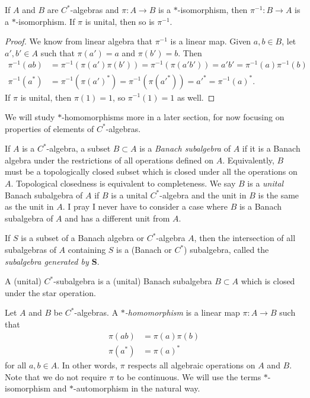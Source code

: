 \begin{proposition}
If $A$ and $B$ are $C^*$-algebras and $\pi:A \rightarrow B$ is a $*$-isomorphism, then $\pi^{-1}:B \rightarrow A$ is a $*$-isomorphism. If $\pi$ is unital, then so is $\pi^{-1}$.
\end{proposition}

\begin{proof}
We know from linear algebra that $\pi^{-1}$ is a linear map. Given $a, b \in B$, let $a', b' \in A$ such that $\pi(a') = a$ and $\pi(b') = b$. Then
\begin{equation}
\begin{aligned}
\pi^{-1}(ab) &= \pi^{-1}(\pi(a')\pi(b')) = \pi^{-1}(\pi(a'b')) = a'b' = \pi^{-1}(a)\pi^{-1}(b)\\
\pi^{-1}(a^*) &= \pi^{-1}(\pi(a')^*) = \pi^{-1}(\pi(a'^*)) = a'^* = \pi^{-1}(a)^*.
\end{aligned}
\end{equation}
If $\pi$ is unital, then $\pi(1) = 1$, so $\pi^{-1}(1) = 1$ as well.
\end{proof}


We will study $*$-homomorphisms more in a later section, for now focusing on properties of elements of $C^*$-algebras.

\begin{definition}
If $A$ is a $C^*$-algebra, a subset $B \subset A$ is a \emph{Banach subalgebra} of $A$ if it is a Banach algebra under the restrictions of all operations defined on $A$. Equivalently, $B$ must be a topologically closed subset which is closed under all the operations on $A$. Topological closedness is equivalent to completeness. We say $B$ is a \emph{unital} Banach subalgebra of $A$ if $B$ is a unital $C^*$-algebra and the unit in $B$ is the same as the unit in $A$.  I pray I never have to consider a case where $B$ is a Banach subalgebra of $A$ and has a different unit from $A$.

If $S$ is a subset of a Banach algebra or $C^*$-algebra $A$, then the intersection of all subalgebras of $A$ containing $S$ is a (Banach or $C^*$) subalgebra, called the \emph{subalgebra generated by $\boldsymbol{S}$}.

A (unital) $C^*$-subalgebra is a (unital) Banach subalgebra $B\subset A$ which is closed under the star operation. 
\end{definition}

\begin{definition}
Let $A$ and $B$ be $C^*$-algebras. A \emph{$\boldsymbol{*}$-homomorphism} is a linear map $\pi:A \rightarrow B$ such that
\begin{equation}
\begin{aligned}
\pi(ab) &= \pi(a)\pi(b)\\
\pi(a^*) &= \pi(a)^*
\end{aligned}
\end{equation}
for all $a, b \in A$. In other words, $\pi$ respects all algebraic operations on $A$ and $B$. Note that we do not require $\pi$ to be continuous. We will use the terms $*$-isomorphism and $*$-automorphism in the natural way.
\end{definition}

